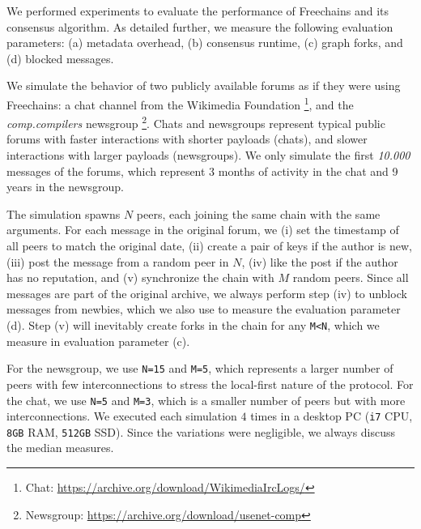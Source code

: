 \documentclass[12pt]{article}
\newcommand{\FC}       {Freechains\xspace}
\begin{document}
We performed experiments to evaluate the performance of \FC and its consensus
algorithm.
%
As detailed further, we measure the following evaluation parameters:
    (a) metadata overhead,
    (b) consensus runtime,
    (c) graph forks, and
    (d) blocked messages.

We simulate the behavior of two publicly available forums as if they were using
\FC:
%
    a chat channel from the Wikimedia Foundation%
\footnote{ Chat: \url{https://archive.org/download/WikimediaIrcLogs/} }, and
    the \emph{comp.compilers} newsgroup%
\footnote{ Newsgroup: \url{https://archive.org/download/usenet-comp} }.
%
Chats and newsgroups represent typical public forums with
    faster interactions with shorter payloads (chats), and
    slower interactions with larger payloads (newsgroups).
%
We only simulate the first \emph{10.000} messages of the forums, which
represent 3 months of activity in the chat and 9 years in the newsgroup.

The simulation spawns $N$ peers, each joining the same chain with the same
arguments.
For each message in the original forum, we
    (i)   set the timestamp of all peers to match the original date,
    (ii)  create a pair of keys if the author is new,
    (iii) post the message from a random peer in $N$,
    (iv)  like the post if the author has no reputation, and
    (v)   synchronize the chain with $M$ random peers.
%
Since all messages are part of the original archive, we always perform step
(iv) to unblock messages from newbies, which we also use to measure the
evaluation parameter (d).
Step (v) will inevitably create forks in the chain for any \texttt{M<N}, which
we measure in evaluation parameter (c).

For the newsgroup, we use \texttt{N=15} and \texttt{M=5}, which represents a
larger number of peers with few interconnections to stress the local-first
nature of the protocol.
For the chat, we use \texttt{N=5} and \texttt{M=3}, which is a smaller number
of peers but with more interconnections.
%
We executed each simulation $4$ times in a desktop PC (\texttt{i7} CPU,
\texttt{8GB} RAM, \texttt{512GB} SSD).
Since the variations were negligible, we always discuss the median measures.

\end{document}
